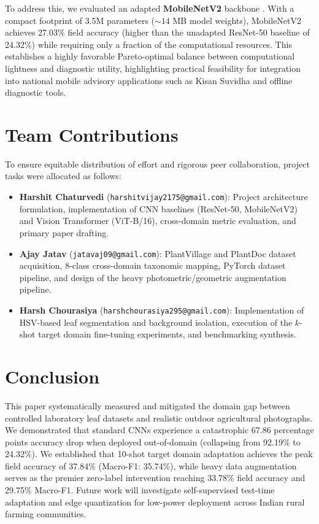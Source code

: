 \documentclass[twoside,a4paper,11pt]{article}
\begin{document}
To address this, we evaluated an adapted \textbf{MobileNetV2} backbone \cite{Sandler:18}. With a compact footprint of 3.5M parameters ($\sim 14$ MB model weights), MobileNetV2 achieves 27.03\% field accuracy (higher than the unadapted ResNet-50 baseline of 24.32\%) while requiring only a fraction of the computational resources. This establishes a highly favorable Pareto-optimal balance between computational lightness and diagnostic utility, highlighting practical feasibility for integration into national mobile advisory applications such as Kisan Suvidha and offline diagnostic tools.

\section{Team Contributions}

To ensure equitable distribution of effort and rigorous peer collaboration, project tasks were allocated as follows:
\begin{itemize}
    \item \textbf{Harshit Chaturvedi} (\texttt{harshitvijay2175@gmail.com}): Project architecture formulation, implementation of CNN baselines (ResNet-50, MobileNetV2) and Vision Transformer (ViT-B/16), cross-domain metric evaluation, and primary paper drafting.
    \item \textbf{Ajay Jatav} (\texttt{jatavaj09@gmail.com}): PlantVillage and PlantDoc dataset acquisition, 8-class cross-domain taxonomic mapping, PyTorch dataset pipeline, and design of the heavy photometric/geometric augmentation pipeline.
    \item \textbf{Harsh Chourasiya} (\texttt{harshchourasiya295@gmail.com}): Implementation of HSV-based leaf segmentation and background isolation, execution of the $k$-shot target domain fine-tuning experiments, and benchmarking synthesis.
\end{itemize}

\section{Conclusion}

This paper systematically measured and mitigated the domain gap between controlled laboratory leaf datasets and realistic outdoor agricultural photographs. We demonstrated that standard CNNs experience a catastrophic 67.86 percentage points accuracy drop when deployed out-of-domain (collapsing from 92.19\% to 24.32\%). We established that 10-shot target domain adaptation achieves the peak field accuracy of 37.84\% (Macro-F1: 35.74\%), while heavy data augmentation serves as the premier zero-label intervention reaching 33.78\% field accuracy and 29.75\% Macro-F1. Future work will investigate self-supervised test-time adaptation and edge quantization for low-power deployment across Indian rural farming communities.
\end{document}
